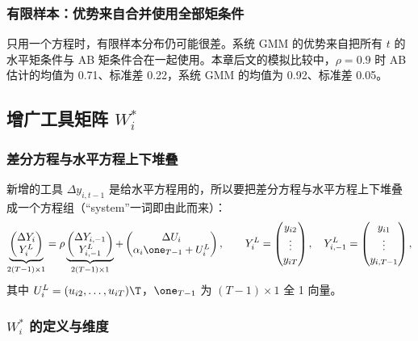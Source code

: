 \subsubsection{有限样本：优势来自合并使用全部矩条件}

只用一个方程时，有限样本分布仍可能很差。系统 GMM 的优势来自把所有 $t$ 的水平矩条件与 AB 矩条件合在一起使用。本章后文的模拟比较中，$\rho=0.9$ 时 AB 估计的均值为 0.71、标准差 0.22，系统 GMM 的均值为 0.92、标准差 0.05。

\subsection{增广工具矩阵 \texorpdfstring{$W_i^*$}{W\_i*}}

\subsubsection{差分方程与水平方程上下堆叠}

新增的工具 $\Delta y_{i,t-1}$ 是给水平方程用的，所以要把差分方程与水平方程上下堆叠成一个方程组（“system”一词即由此而来）：
\[
\underbrace{\begin{pmatrix}\Delta Y_i\\ Y_i^L\end{pmatrix}}_{2(T-1)\times1}
=\rho\underbrace{\begin{pmatrix}\Delta Y_{i,-1}\\ Y_{i,-1}^L\end{pmatrix}}_{2(T-1)\times1}
+\begin{pmatrix}\Delta U_i\\ \alpha_i\one_{T-1}+U_i^L\end{pmatrix},\qquad
Y_i^L=\begin{pmatrix}y_{i2}\\ \vdots\\ y_{iT}\end{pmatrix},\quad
Y_{i,-1}^L=\begin{pmatrix}y_{i1}\\ \vdots\\ y_{i,T-1}\end{pmatrix},
\]
其中 $U_i^L=(u_{i2},\dots,u_{iT})\T$，$\one_{T-1}$ 为 $(T-1)\times1$ 全 1 向量。

\subsubsection{\texorpdfstring{$W_i^*$}{W\_i*} 的定义与维度}

